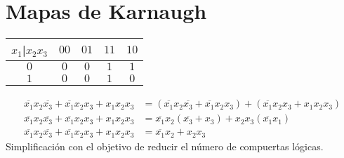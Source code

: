 \documentclass[12pt, twoside]{article}
\begin{document}
\section*{Mapas de Karnaugh}%
\begin{center}
	\begin{tabular}{c|c|c|c|c|}
		$x_1$|$x_2x_3$ & $00$ & $01$ & $11$ & $10$\\
		\hline
		$0$ & $0$ & $0$ & $1$ & $1$\\
		\hline
		$1$ & $0$ & $0$ & $1$ & $0$\\
	\end{tabular}
\end{center}
\begin{align*}
	\overline{x_1}x_2\overline{x_3}+\overline{x_1}x_2x_3+x_1x_2x_3&=
	( \overline{x_1}x_2\overline{x_3}+\overline{x_1}x_2x_3 )+( \overline{x_1}x_2x_3+x_1x_2x_3 )\\
	\overline{x_1}x_2\overline{x_3}+\overline{x_1}x_2x_3+x_1x_2x_3&=
	\overline{x_1}x_2(\overline{x_3}+x_3)+x_2x_3(\overline{x_1}x_1)\\
	\overline{x_1}x_2\overline{x_3}+\overline{x_1}x_2x_3+x_1x_2x_3&=
	\boxed
	{
		\overline{x_1}x_2+x_2x_3
	}
\end{align*}
Simplificación con el objetivo de reducir el número de compuertas lógicas.
\end{document}
